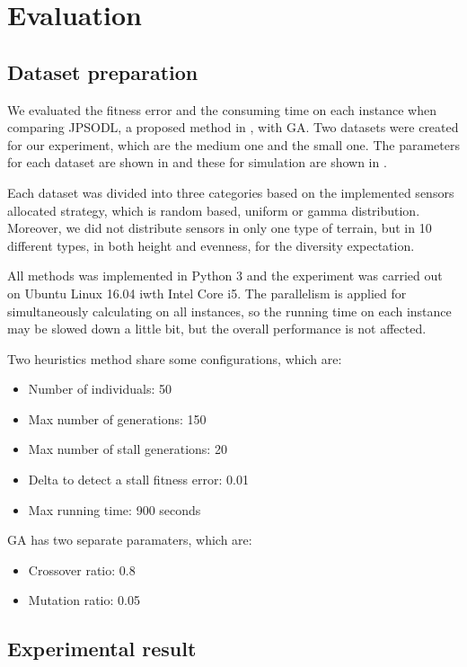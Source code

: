 \section{Evaluation}


\subsection{Dataset preparation}


	We evaluated the fitness error and the consuming time on each instance when comparing JPSODL, a proposed method in \cite{lu2014construction}, with GA. Two datasets were created for our experiment, which are the medium one and the small one. The parameters for each dataset are shown in and these for simulation are shown in .
	
	Each dataset was divided into three categories based on the implemented sensors allocated strategy, which is random based, uniform or gamma distribution. Moreover, we did not distribute sensors in only one type of terrain, but in 10 different types, in both height and evenness, for the diversity expectation.
	
	All methods was implemented in Python 3 and the experiment was carried out on Ubuntu Linux 16.04 iwth Intel Core i5. The parallelism is applied for simultaneously calculating on all instances, so the running time on each instance may be slowed down a little bit, but the overall performance is not affected.
	
	Two heuristics method share some configurations, which are:
\begin{itemize}
	\item Number of individuals: 50
	\item Max number of generations: 150
	\item Max number of stall generations: 20
	\item Delta to detect a stall fitness error: 0.01
	\item Max running time: 900 seconds
\end{itemize}
	
	GA has two separate paramaters, which are:
\begin{itemize}
	\item Crossover ratio: 0.8
	\item Mutation ratio: 0.05
\end{itemize}

\subsection{Experimental result}

